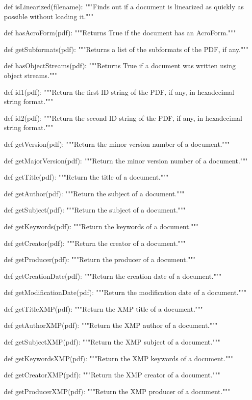 def isLinearized(filename):
    """Finds out if a document is linearized as quickly as possible without
    loading it."""

def hasAcroForm(pdf):
    """Returns True if the document has an AcroForm."""

def getSubformats(pdf):
    """Returns a list of the subformats of the PDF, if any."""

def hasObjectStreams(pdf):
    """Returns True if a document was written using object streams."""

def id1(pdf):
    """Return the first ID string of the PDF, if any, in hexadecimal string
    format."""

def id2(pdf):
    """Return the second ID string of the PDF, if any, in hexadecimal string
    format."""

def getVersion(pdf):
    """Return the minor version number of a document."""

def getMajorVersion(pdf):
    """Return the minor version number of a document."""

def getTitle(pdf):
    """Return the title of a document."""

def getAuthor(pdf):
    """Return the subject of a document."""

def getSubject(pdf):
    """Return the subject of a document."""

def getKeywords(pdf):
    """Return the keywords of a document."""

def getCreator(pdf):
    """Return the creator of a document."""

def getProducer(pdf):
    """Return the producer of a document."""

def getCreationDate(pdf):
    """Return the creation date of a document."""

def getModificationDate(pdf):
    """Return the modification date of a document."""

def getTitleXMP(pdf):
    """Return the XMP title of a document."""

def getAuthorXMP(pdf):
    """Return the XMP author of a document."""

def getSubjectXMP(pdf):
    """Return the XMP subject of a document."""

def getKeywordsXMP(pdf):
    """Return the XMP keywords of a document."""

def getCreatorXMP(pdf):
    """Return the XMP creator of a document."""

def getProducerXMP(pdf):
    """Return the XMP producer of a document."""

